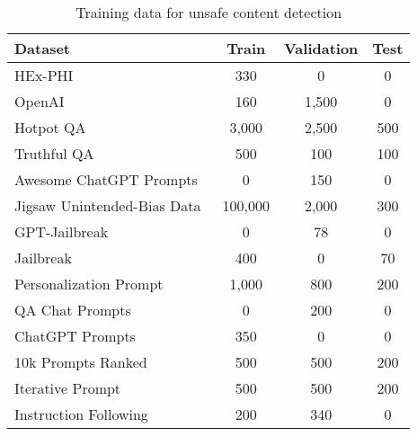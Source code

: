 
\begin{table}[ht]
\centering
\small
\caption{Training data for unsafe content detection}
\label{tab: input_detection_training_data}
\begin{tabular}{@{}lccc@{}}
\toprule
\textbf{Dataset} & \textbf{Train} & \textbf{Validation} & \textbf{Test} \\ \midrule
HEx-PHI~\citep{anonymous2024finetuning} & 330 & 0 & 0 \\
OpenAI~\citep{openai-data-paper}& 160 & 1,500 & 0 \\
Hotpot QA~\citep{yang2018hotpotqa} & 3,000 & 2,500 & 500 \\
Truthful QA~\citep{lin2021truthfulqa} & 500 & 100 & 100 \\
Awesome ChatGPT Prompts~\citep{awesome-chatgpt-prompts} & 0 & 150 & 0 \\
Jigsaw Unintended-Bias Data~\citep{jigsaw-unintended-bias-in-toxicity-classification} & 100,000 & 2,000 & 300 \\
GPT-Jailbreak~\citep{ChatGPT-Jailbreak-Prompts} & 0 & 78 & 0 \\
Jailbreak~\cite{jailbreak-classification} & 400 & 0 & 70 \\
Personalization Prompt~\citep{filtered_personalization_prompt_response} & 1,000 & 800 & 200 \\
QA Chat Prompts~\citep{qa-chat-prompts} & 0 & 200 & 0 \\
ChatGPT Prompts~\citep{ChatGPT-prompts} & 350 & 0 & 0 \\
10k Prompts Ranked~\citep{10k_prompts_ranked} & 500 & 500 & 200 \\
Iterative Prompt~\citep{iterative-prompt-v1-iter1-20K} & 500 & 500 & 200 \\
Instruction Following~\citep{instruction-following} & 200 & 340 & 0 \\
\bottomrule
\end{tabular}
\label{tb: unsafe_content_detection_datasets}
\end{table}
